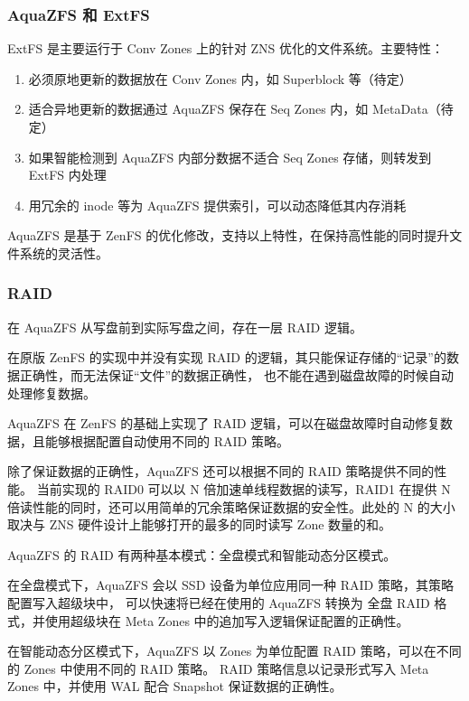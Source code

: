 \subsubsection*{AquaZFS 和 ExtFS}

ExtFS 是主要运行于 Conv Zones 上的针对 ZNS 优化的文件系统。主要特性：

\begin{enumerate}
    \item 必须原地更新的数据放在 Conv Zones 内，如 Superblock 等（待定）
    \item 适合异地更新的数据通过 AquaZFS 保存在 Seq Zones 内，如 MetaData（待定）
    \item 如果智能检测到 AquaZFS 内部分数据不适合 Seq Zones 存储，则转发到 ExtFS 内处理
    \item 用冗余的 inode 等为 AquaZFS 提供索引，可以动态降低其内存消耗
\end{enumerate}

AquaZFS 是基于 ZenFS 的优化修改，支持以上特性，在保持高性能的同时提升文件系统的灵活性。

\subsubsection*{RAID}

在 AquaZFS 从写盘前到实际写盘之间，存在一层 RAID 逻辑。

在原版 ZenFS 的实现中并没有实现 RAID 的逻辑，其只能保证存储的“记录”的数据正确性，而无法保证“文件”的数据正确性，
也不能在遇到磁盘故障的时候自动处理修复数据。

AquaZFS 在 ZenFS 的基础上实现了 RAID 逻辑，可以在磁盘故障时自动修复数据，且能够根据配置自动使用不同的 RAID 策略。

除了保证数据的正确性，AquaZFS 还可以根据不同的 RAID 策略提供不同的性能。
当前实现的 RAID0 可以以 N 倍加速单线程数据的读写，RAID1 在提供 N 倍读性能的同时，还可以用简单的冗余策略保证数据的安全性。此处的 N 的大小取决与 ZNS 硬件设计上能够打开的最多的同时读写 Zone 数量的和。

AquaZFS 的 RAID 有两种基本模式：全盘模式和智能动态分区模式。

在全盘模式下，AquaZFS 会以 SSD 设备为单位应用同一种 RAID 策略，其策略配置写入超级块中，
可以快速将已经在使用的 AquaZFS 转换为 全盘 RAID 格式，并使用超级块在 Meta Zones 中的追加写入逻辑保证配置的正确性。

在智能动态分区模式下，AquaZFS 以 Zones 为单位配置 RAID 策略，可以在不同的 Zones 中使用不同的 RAID 策略。
RAID 策略信息以记录形式写入 Meta Zones 中，并使用 WAL 配合 Snapshot 保证数据的正确性。

